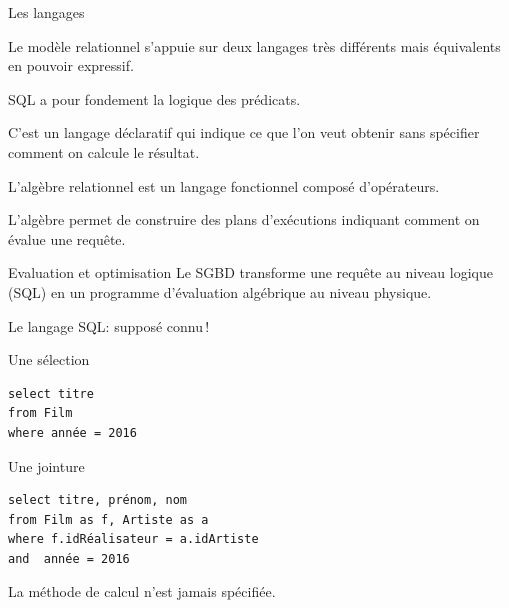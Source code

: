 \begin{frame}{Les langages}

Le modèle relationnel s'appuie sur deux langages très différents mais \alert{équivalents} 
en pouvoir expressif.

\vfill

\begin{redbullet}

   \item SQL a pour fondement la logique des prédicats. 
   
       \medskip
       
       C'est un langage \alert{déclaratif} qui indique ce que l'on veut obtenir
          sans spécifier \alert{comment} on calcule le résultat.
          
          
        \item L'\alert{algèbre relationnel} est un langage fonctionnel composé
            d'opérateurs. 
            
            
            L'algèbre permet de construire des \alert{plans d'exécutions} indiquant
            comment on évalue une requête.
\end{redbullet}


\vfill
\begin{blocgauche}

\begin{defblock}{Evaluation et optimisation}
Le SGBD transforme une requête au niveau logique (SQL) en un programme d'évaluation
algébrique au niveau physique.
\end{defblock}


\end{blocgauche}

\end{frame}


\begin{frame}[fragile]{Le langage SQL: supposé connu\,!}

Une sélection
\vfill

\begin{verbatim}
select titre
from Film
where année = 2016
\end{verbatim}

\vfill

Une jointure

\vfill

\begin{verbatim}
select titre, prénom, nom
from Film as f, Artiste as a
where f.idRéalisateur = a.idArtiste
and  année = 2016
\end{verbatim}

\vfill

La méthode de calcul n'est jamais spécifiée.

\end{frame}


